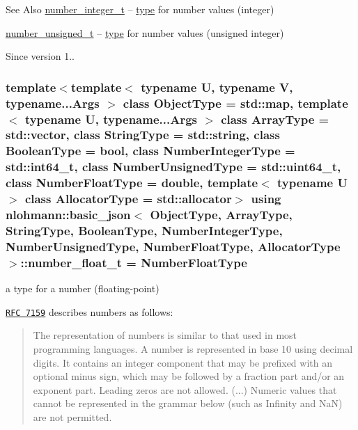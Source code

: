 \begin{DoxySeeAlso}{See Also}
\hyperlink{classnlohmann_1_1basic__json_ac4b10b2364f26ce47bdb9a413ff04a59}{number\-\_\-integer\-\_\-t} -- \hyperlink{classnlohmann_1_1basic__json_a5d466b240d0ba9f648d7fd4ff42359f5}{type} for number values (integer)

\hyperlink{classnlohmann_1_1basic__json_a60a04166c122072ab11eaf9845d9cd1d}{number\-\_\-unsigned\-\_\-t} -- \hyperlink{classnlohmann_1_1basic__json_a5d466b240d0ba9f648d7fd4ff42359f5}{type} for number values (unsigned integer)
\end{DoxySeeAlso}
\begin{DoxySince}{Since}
version 1.. 
\end{DoxySince}
\hypertarget{classnlohmann_1_1basic__json_a74a0013e847fdc574b48f931f0e757e1}{
\subsubsection[{number\-\_\-float\-\_\-t}]{\setlength{\rightskip}{0pt plus 5cm}template$<$template$<$ typename U, typename V, typename...\-Args $>$ class Object\-Type = std\-::map, template$<$ typename U, typename...\-Args $>$ class Array\-Type = std\-::vector, class String\-Type  = std\-::string, class Boolean\-Type  = bool, class Number\-Integer\-Type  = std\-::int64\-\_\-t, class Number\-Unsigned\-Type  = std\-::uint64\-\_\-t, class Number\-Float\-Type  = double, template$<$ typename U $>$ class Allocator\-Type = std\-::allocator$>$ using {\bf nlohmann\-::basic\-\_\-json}$<$ Object\-Type, Array\-Type, String\-Type, Boolean\-Type, Number\-Integer\-Type, Number\-Unsigned\-Type, Number\-Float\-Type, Allocator\-Type $>$\-::{\bf number\-\_\-float\-\_\-t} =  Number\-Float\-Type}}\label{classnlohmann_1_1basic__json_a74a0013e847fdc574b48f931f0e757e1}


a type for a number (floating-\/point) 

\href{http://rfc7159.net/rfc7159}{\tt R\-F\-C 7159} describes numbers as follows\-: \begin{quotation}
The representation of numbers is similar to that used in most programming languages. A number is represented in base 10 using decimal digits. It contains an integer component that may be prefixed with an optional minus sign, which may be followed by a fraction part and/or an exponent part. Leading zeros are not allowed. (...) Numeric values that cannot be represented in the grammar below (such as Infinity and Na\-N) are not permitted.

\end{quotation}


